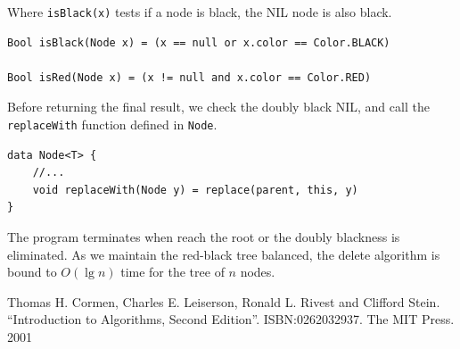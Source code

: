 \documentclass[b5paper]{article}
\begin{document}
Where \texttt{isBlack(x)} tests if a node is black, the NIL node is also black.

\begin{lstlisting}[language = Bourbaki]
Bool isBlack(Node x) = (x == null or x.color == Color.BLACK)

Bool isRed(Node x) = (x != null and x.color == Color.RED)
\end{lstlisting}

Before returning the final result, we check the doubly black NIL, and call the \texttt{replaceWith} function defined in \texttt{Node}.

\begin{lstlisting}[language = Bourbaki]
data Node<T> {
    //...
    void replaceWith(Node y) = replace(parent, this, y)
}
\end{lstlisting}

The program terminates when reach the root or the doubly blackness is eliminated. As we maintain the red-black tree balanced, the delete algorithm is bound to $O(\lg n)$ time for the tree of $n$ nodes.

\begin{Exercise}
\end{Exercise}

\ifx\wholebook\relax \else
\begin{thebibliography}{99}

Thomas H. Cormen, Charles E. Leiserson, Ronald L. Rivest and Clifford Stein.
``Introduction to Algorithms, Second Edition''. ISBN:0262032937. The MIT Press. 2001

\end{thebibliography}

\expandafter\enddocument
\fi
\end{document}
